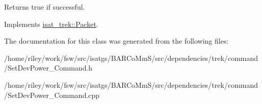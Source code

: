 \begin{DoxyReturn}{Returns}
true if successful. 
\end{DoxyReturn}


Implements \hyperlink{classisat__trek_1_1_packet}{isat\+\_\+trek\+::\+Packet}.



The documentation for this class was generated from the following files\+:\begin{DoxyCompactItemize}
\item 
/home/riley/work/fsw/src/isatgs/\+B\+A\+R\+Co\+Mm\+S/src/dependencies/trek/command/Set\+Dev\+Power\+\_\+\+Command.\+h\item 
/home/riley/work/fsw/src/isatgs/\+B\+A\+R\+Co\+Mm\+S/src/dependencies/trek/command/Set\+Dev\+Power\+\_\+\+Command.\+cpp\end{DoxyCompactItemize}
